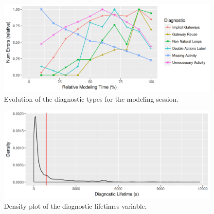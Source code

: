 \begin{figure}
\includegraphics[width=\textwidth]{figures/results/evolution}
\caption{Evolution of the diagnostic types for the modeling session.}
\label{fig:error_evolution}
\end{figure}
\begin{figure}

\includegraphics[width=\textwidth]{figures/results/lifetime_density.png}
\caption{Density plot of the diagnostic lifetimes variable.}
\label{fig:avg_lifetime_distribution}
\end{figure}

